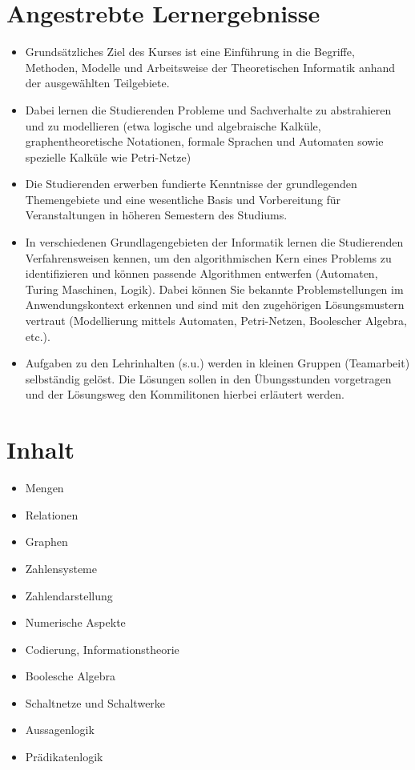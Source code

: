 \section*{Angestrebte
Lernergebnisse\label{/mi-2017/modulbeschreibungen-bachelor/BA_TheoretischeInformatik1}}\label{angestrebte-lernergebnissepathlabelmi-2017modulbeschreibungen-bachelorbaux5ftheoretischeinformatik1}

\begin{itemize}
\tightlist
\item
  Grundsätzliches Ziel des Kurses ist eine Einführung in die Begriffe,
  Methoden, Modelle und Arbeitsweise der Theoretischen Informatik anhand
  der ausgewählten Teilgebiete.
\item
  Dabei lernen die Studierenden Probleme und Sachverhalte zu
  abstrahieren und zu modellieren (etwa logische und algebraische
  Kalküle, graphentheoretische Notationen, formale Sprachen und
  Automaten sowie spezielle Kalküle wie Petri-Netze)
\item
  Die Studierenden erwerben fundierte Kenntnisse der grundlegenden
  Themengebiete und eine wesentliche Basis und Vorbereitung für
  Veranstaltungen in höheren Semestern des Studiums.
\item
  In verschiedenen Grundlagengebieten der Informatik lernen die
  Studierenden Verfahrensweisen kennen, um den algorithmischen Kern
  eines Problems zu identifizieren und können passende Algorithmen
  entwerfen (Automaten, Turing Maschinen, Logik). Dabei können Sie
  bekannte Problemstellungen im Anwendungskontext erkennen und sind mit
  den zugehörigen Lösungsmustern vertraut (Modellierung mittels
  Automaten, Petri-Netzen, Boolescher Algebra, etc.).
\item
  Aufgaben zu den Lehrinhalten (s.u.) werden in kleinen Gruppen
  (Teamarbeit) selbständig gelöst. Die Lösungen sollen in den
  Übungsstunden vorgetragen und der Lösungsweg den Kommilitonen hierbei
  erläutert werden.
\end{itemize}

\section*{Inhalt\label{/mi-2017/modulbeschreibungen-bachelor/BA_TheoretischeInformatik1}}\label{inhaltpathlabelmi-2017modulbeschreibungen-bachelorbaux5ftheoretischeinformatik1}

\begin{itemize}
\tightlist
\item
  Mengen
\item
  Relationen
\item
  Graphen
\item
  Zahlensysteme
\item
  Zahlendarstellung
\item
  Numerische Aspekte
\item
  Codierung, Informationstheorie
\item
  Boolesche Algebra
\item
  Schaltnetze und Schaltwerke
\item
  Aussagenlogik
\item
  Prädikatenlogik
\end{itemize}

